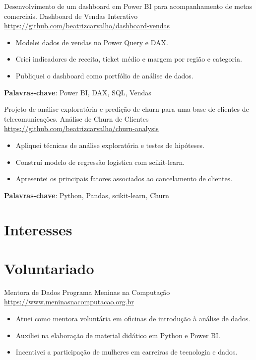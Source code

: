 \documentclass[a4paper, serif, 10pt]{moderncv}
\begin{document}
        {Desenvolvimento de um dashboard em Power BI para acompanhamento de metas comerciais.}
        {Dashboard de Vendas Interativo}
        {\url{https://github.com/beatrizcarvalho/dashboard-vendas}}
        {}
        {\begin{itemize}
\item Modelei dados de vendas no Power Query e DAX.
\item Criei indicadores de receita, ticket médio e margem por região e
categoria.
\item Publiquei o dashboard como portfólio de análise de dados.
\end{itemize}
\textbf{Palavras-chave}: Power BI, DAX, SQL, Vendas}

        {Projeto de análise exploratória e predição de churn para uma base de clientes de telecomunicações.}
        {Análise de Churn de Clientes}
        {\url{https://github.com/beatrizcarvalho/churn-analysis}}
        {}
        {\begin{itemize}
\item Apliquei técnicas de análise exploratória e testes de hipóteses.
\item Construí modelo de regressão logística com scikit-learn.
\item Apresentei os principais fatores associados ao cancelamento de clientes.
\end{itemize}
\textbf{Palavras-chave}: Python, Pandas, scikit-learn, Churn}
\section{Interesses}

\section{Voluntariado}

        {Mentora de Dados}
        {Programa Meninas na Computação}
        {\url{https://www.meninasnacomputacao.org.br}}
        {}
        {\begin{itemize}
\item Atuei como mentora voluntária em oficinas de introdução à análise de
dados.
\item Auxiliei na elaboração de material didático em Python e Power BI.
\item Incentivei a participação de mulheres em carreiras de tecnologia e
dados.
\end{itemize}}
\end{document}
